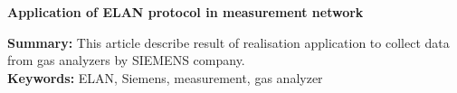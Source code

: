 \begin{center}
\textbf{Application of ELAN protocol in measurement network}
\end{center}
\textbf{Summary: }
This article describe result of realisation application to collect data from gas analyzers by SIEMENS company.\\
\textbf{Keywords: } ELAN, Siemens, measurement, gas analyzer
\clearpage